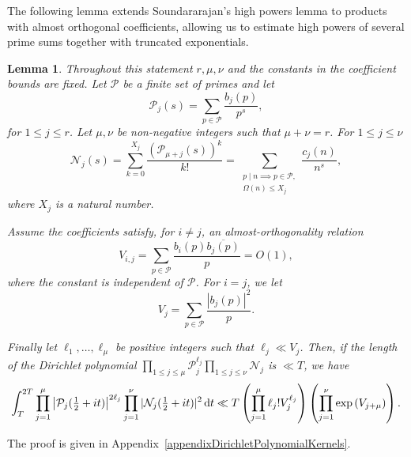 \documentclass[oneside, 12pt]{amsart}
\newtheorem{lem}[thm]{Lemma}
\theoremstyle{definition}
\newcommand{\dt}{\, \textup{d}t}
\begin{document}
	The following lemma extends Soundararajan's high powers lemma
	\cite{Sound1} to products with almost orthogonal coefficients,
	allowing us to estimate high powers of several prime sums together
	with truncated exponentials.
	
	\begin{lem}\label{highPowersAndSomeSquaresUntwistedLemma}
		{Throughout this statement $r,\mu,\nu$ and the constants in
			the coefficient bounds are fixed.} Let $\mathcal{P}$ be a finite set of primes and let $$\mathcal{P}_{j}(s)=\sum_{p \in \mathcal{P}} \frac{b_j(p)}{p^s},$$ for $1\leq j \leq r$. Let $\mu,\nu$ be non-negative integers such that $\mu+\nu=r$. For $1\leq j \leq \nu$ $$\mathcal{N}_j(s)=\sum_{k=0}^{X_j} \frac{(\mathcal{P}_{\mu+j}(s))^k}{k!} = \sum_{\substack{p \mid n \implies p \in \mathcal{P}, \\ \Omega(n)\leq X_j}} \frac{c_j(n)}{n^s},$$ where $X_j$ is a natural number. 
		
		Assume the coefficients satisfy, for $i\neq j$, an almost-orthogonality relation $$V_{i,j}=\sum_{p \in \mathcal{P}} \frac{b_{i}(p)\overline{b_j(p)}}{p}=O(1),$$ where the constant is independent of $\mathcal{P}$. For $i=j$, we let $$V_j = \sum_{p \in \mathcal{P}} \frac{|b_j(p)|^2}{p}.$$
		
		Finally let $\ell_1,\dots,\ell_\mu$ be positive integers such that $\ell_j \ll V_j$. Then, if the length of the Dirichlet polynomial $\prod_{1\leq j \leq \mu} \mathcal{P}_j^{\ell_j} \prod_{1\leq j \leq \nu} \mathcal{N}_{j}$ is $\ll T$, we have $$\int_{T}^{2T} \prod_{j=1}^\mu \left|\mathcal{P}_j(\tfrac12+it)\right|^{2\ell_j} \prod_{j=1}^{\nu} |\mathcal{N}_j(\tfrac12+it)|^2 \dt \ll T\left(\prod_{j=1}^\mu \ell_j! V_j^{\ell_j}\right)\left( \prod_{j=1}^{\nu} \exp\left( V_{j+\mu}\right)\right).$$ 
	\end{lem}
	
	{The proof is given in
		Appendix~\ref{appendixDirichletPolynomialKernels}.}
	
\end{document}
